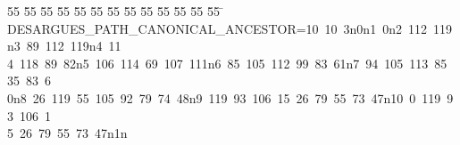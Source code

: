 %
%
\begin{tabbing}
55 \= 55 \= 55 \= 55 \= 55 \= 55 \= 55 \= 55 \= 55 \= 55 \= 55 \= 55 \= 55 \= \kill
DESARGUES\_PATH\_CANONICAL\_ANCESTOR=10\ 10\ 3n0n1\ 0n2\ 112\ 119n3\ 89\ 112\ 119n4\ 11\\[0pt]
4\ 118\ 89\ 82n5\ 106\ 114\ 69\ 107\ 111n6\ 85\ 105\ 112\ 99\ 83\ 61n7\ 94\ 105\ 113\ 85\ 35\ 83\ 6\\[0pt]
0n8\ 26\ 119\ 55\ 105\ 92\ 79\ 74\ 48n9\ 119\ 93\ 106\ 15\ 26\ 79\ 55\ 73\ 47n10\ 0\ 119\ 93\ 106\ 1\\[0pt]
5\ 26\ 79\ 55\ 73\ 47n1n\\[0pt]
\end{tabbing}
